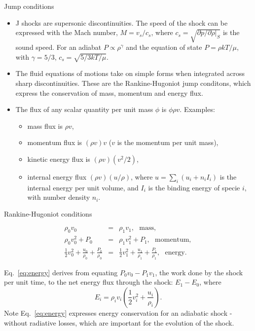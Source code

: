 \begin{frame}{Jump conditions}

\begin{itemize}

\item J shocks are supersonic discontinuities. The speed of the shock
  can be expressed with the Mach number, $M = v_s/c_s$, where $c_s =
  \sqrt{\partial p / \partial \rho |_S }$ is the sound speed. For an
  adiabat $P \propto \rho^\gamma$ and the equation of state $P = \rho
  k T / \mu$, with $\gamma = 5/3$, $c_s = \sqrt{5/3 k T / \mu}$.

\item The fluid equations of motions take on simple forms when
  integrated across sharp discontinuities. These are the
  Rankine-Hugoniot jump conditons, which express the conservation of
  mass, momentum and energy flux.

\item The flux of any scalar quantity per unit mass $\phi$ is $\phi
  \rho v$. Examples: 
\begin{itemize}
\item mass flux is $\rho v$, 
\item momentum flux is $(\rho v)
  v$ ($v$ is the momentum per unit mass), 
\item kinetic energy flux is  $(\rho v) (v^2 / 2)$,
\item internal energy flux  $(\rho v) (u / \rho)$, where $u = \sum_i
  (u_i + n_i I_i)$ is the internal energy per unit volume, and $I_i$ is
  the binding energy of specie $i$, with number density $n_i$. 

\end{itemize}


\end{itemize}

\end{frame}




\begin{frame}{Rankine-Hugoniot conditions}

\begin{eqnarray}
\rho_0 v_0  & =  & \rho_1 v_1, ~~~ \text{mass} , \\
\rho_0 v_0^2 + P_0   & =  & \rho_1 v_1^2 + P_1, ~~~ \text{momentum} , \\
\frac{1}{2} v_0^2 + \frac{u_0}{\rho_0} + \frac{P_0}{\rho_0}   & =  & 
\frac{1}{2} v_1^2 + \frac{u_1}{\rho_1} + \frac{P_1}{\rho_1}
, ~~~ \text{energy}. \label{eq:energy}
\end{eqnarray}

Eq.~\ref{eq:energy} derives from equating $P_0 v_0 - P_1 v_1 $, the
work done by the shock per unit time, to the net energy flux through
the shock: $E_1 - E_0$, where \[ E_i = \rho_i v_i \left(\frac{1}{2}
v_i^2 + \frac{u_i}{\rho_i}\right) . \] Note Eq.~\ref{eq:energy}
expresses energy conservation for an adiabatic shock - without
radiative losses, which are important for the evolution of the shock.


\end{frame}




